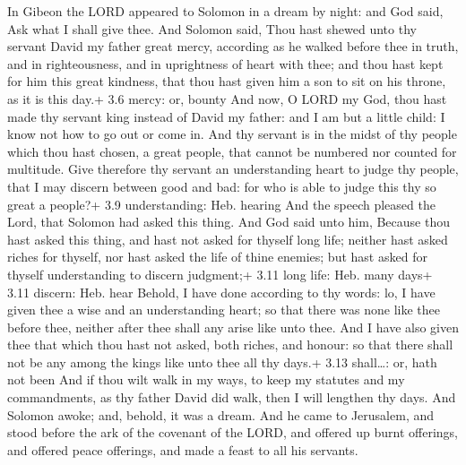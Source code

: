  In Gibeon the LORD appeared to Solomon in a dream by
night: and God said, Ask what I shall give thee.  And
Solomon said, Thou hast shewed unto thy servant David my father great
mercy, according as he walked before thee in truth, and in
righteousness, and in uprightness of heart with thee; and thou hast kept
for him this great kindness, that thou hast given him a son to sit on
his throne, as it is this day.+ 3.6 mercy: or, bounty  And
now, O LORD my God, thou hast made thy servant king instead of David my
father: and I am but a little child: I know not how to go out or come
in.  And thy servant is in the midst of thy people which
thou hast chosen, a great people, that cannot be numbered nor counted
for multitude.  Give therefore thy servant an understanding
heart to judge thy people, that I may discern between good and bad: for
who is able to judge this thy so great a people?+ 3.9 understanding:
Heb. hearing  And the speech pleased the Lord, that Solomon
had asked this thing.  And God said unto him, Because thou
hast asked this thing, and hast not asked for thyself long life; neither
hast asked riches for thyself, nor hast asked the life of thine enemies;
but hast asked for thyself understanding to discern judgment;+ 3.11 long
life: Heb. many days+ 3.11 discern: Heb. hear  Behold, I
have done according to thy words: lo, I have given thee a wise and an
understanding heart; so that there was none like thee before thee,
neither after thee shall any arise like unto thee.  And I
have also given thee that which thou hast not asked, both riches, and
honour: so that there shall not be any among the kings like unto thee
all thy days.+ 3.13 shall\ldots: or, hath not been  And if
thou wilt walk in my ways, to keep my statutes and my commandments, as
thy father David did walk, then I will lengthen thy days. 
And Solomon awoke; and, behold, it was a dream. And he came to
Jerusalem, and stood before the ark of the covenant of the LORD, and
offered up burnt offerings, and offered peace offerings, and made a
feast to all his servants.

